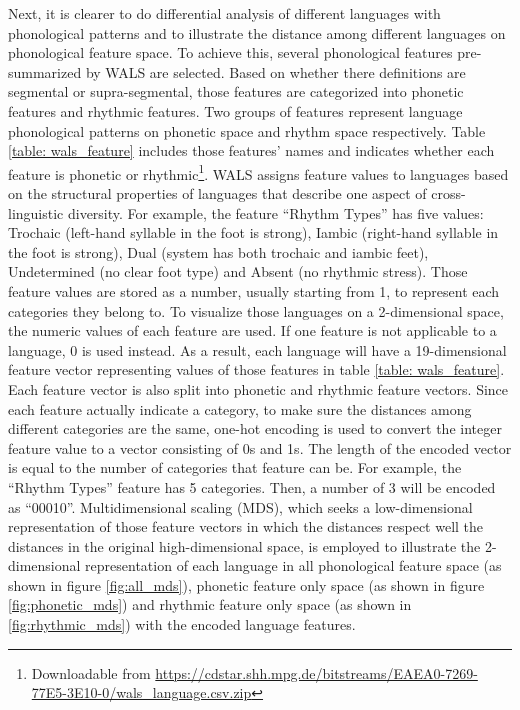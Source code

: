 Next, it is clearer to do differential analysis of different languages with phonological patterns and to illustrate the distance among different languages on phonological feature space. To achieve this, several phonological features pre-summarized by WALS are selected. Based on whether there definitions are segmental or supra-segmental, those features are categorized into phonetic features and rhythmic features. Two groups of features represent language phonological patterns on phonetic space and rhythm space respectively. Table \ref{table: wals_feature} includes those features' names and indicates whether each feature is phonetic or rhythmic\footnote{Downloadable from \url{https://cdstar.shh.mpg.de/bitstreams/EAEA0-7269-77E5-3E10-0/wals_language.csv.zip}}. WALS assigns feature values to languages based on the structural properties of languages that describe one aspect of cross-linguistic diversity. For example, the feature ``Rhythm Types'' has five values: Trochaic (left-hand syllable in the foot is strong), Iambic (right-hand syllable in the foot is strong), Dual (system has both trochaic and iambic feet), Undetermined (no clear foot type) and Absent (no rhythmic stress). Those feature values are stored as a number, usually starting from 1, to represent each categories they belong to. To visualize those languages on a 2-dimensional space, the numeric values of each feature are used. If one feature is not applicable to a language, 0 is used instead. As a result, each language will have a 19-dimensional feature vector representing values of those features in table \ref{table: wals_feature}. Each feature vector is also split into phonetic and rhythmic feature vectors. Since each feature actually indicate a category, to make sure the distances among different categories are the same, one-hot encoding is used to convert the integer feature value to a vector consisting of 0s and 1s. The length of the encoded vector is equal to the number of categories that feature can be. For example, the ``Rhythm Types'' feature has 5 categories. Then, a number of 3 will be encoded as ``00010''. Multidimensional scaling (MDS), which seeks a low-dimensional representation of those feature vectors in which the distances respect well the distances in the original high-dimensional space, is employed to illustrate the 2-dimensional representation of each language in all phonological feature space (as shown in figure \ref{fig:all_mds}), phonetic feature only space (as shown in figure \ref{fig:phonetic_mds}) and rhythmic feature only space (as shown in \ref{fig:rhythmic_mds}) with the encoded language features.

